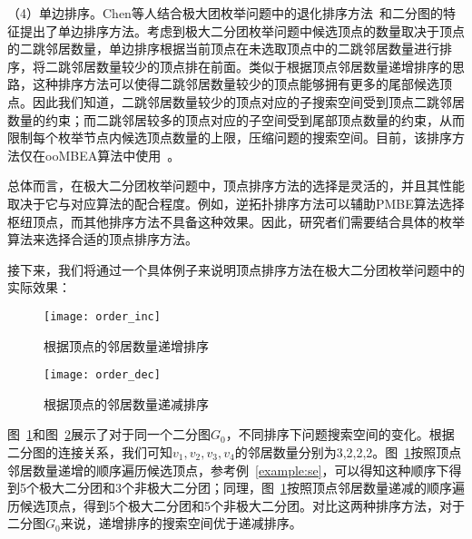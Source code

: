 （4）单边排序。Chen等人结合极大团枚举问题中的退化排序方法~\cite{MCEdegeneracy10}和二分图的特征提出了单边排序方法。考虑到极大二分团枚举问题中候选顶点的数量取决于顶点的二跳邻居数量，单边排序根据当前顶点在未选取顶点中的二跳邻居数量进行排序，将二跳邻居数量较少的顶点排在前面。类似于根据顶点邻居数量递增排序的思路，这种排序方法可以使得二跳邻居数量较少的顶点能够拥有更多的尾部候选顶点。因此我们知道，二跳邻居数量较少的顶点对应的子搜索空间受到顶点二跳邻居数量的约束；而二跳邻居较多的顶点对应的子空间受到尾部顶点数量的约束，从而限制每个枚举节点内候选顶点数量的上限，压缩问题的搜索空间。目前，该排序方法仅在ooMBEA算法中使用~\cite{ooMBE22}。


总体而言，在极大二分团枚举问题中，顶点排序方法的选择是灵活的，并且其性能取决于它与对应算法的配合程度。例如，逆拓扑排序方法可以辅助PMBE算法选择枢纽顶点，而其他排序方法不具备这种效果。因此，研究者们需要结合具体的枚举算法来选择合适的顶点排序方法。


接下来，我们将通过一个具体例子来说明顶点排序方法在极大二分团枚举问题中的实际效果：

\begin{figure} [H]
  \center
    \vspace{0.1in}
		\texttt{[image: order\_inc]}
    \vspace{0.05in}
	\caption{根据顶点的邻居数量递增排序}
	\label{fig:order_inc}
\end{figure}


\begin{figure} [H]
  \center
  \vspace{0.1in}
    \texttt{[image: order\_dec]}
    \vspace{0.05in}
  \caption{根据顶点的邻居数量递减排序}
	\label{fig:order_dec}
\end{figure}

\begin{example}
  图~\ref{fig:order_inc}和图~\ref{fig:order_dec}展示了对于同一个二分图$G_0$，不同排序下问题搜索空间的变化。根据二分图的连接关系，我们可知$v_1,v_2,v_3,v_4$的邻居数量分别为3,2,2,2。图~\ref{fig:order_inc}按照顶点邻居数量递增的顺序遍历候选顶点，参考例~\ref{example:se}，可以得知这种顺序下得到5个极大二分团和3个非极大二分团；同理，图~\ref{fig:order_inc}按照顶点邻居数量递减的顺序遍历候选顶点，得到5个极大二分团和5个非极大二分团。对比这两种排序方法，对于二分图$G_0$来说，递增排序的搜索空间优于递减排序。
\end{example}





